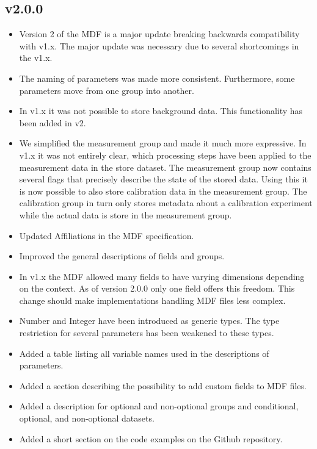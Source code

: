 \documentclass[landscape,a4paper]{article} %
\newcommand{\inlvar}[1]{{\ttfamily#1}}
\begin{document}
\begin{multicols}{2}
\subsection{v2.0.0}

\begin{itemize}
	\item Version 2 of the MDF is a major update breaking backwards compatibility with v1.x. The major update was necessary due to several shortcomings in the v1.x.
	\item The naming of parameters was made more consistent. Furthermore, some parameters move from one group into another.
	\item In v1.x it was not possible to store background data. This functionality has been added in v2.
	\item We simplified the measurement group and made it much more expressive. In v1.x it was not entirely clear, which processing steps have been applied to the measurement data in the store dataset. The \inlvar{measurement} group now contains several flags that precisely describe the state of the stored data. Using this it is now possible to also store calibration data in the \inlvar{measurement} group. The calibration group in turn only stores metadata about a calibration experiment while the actual data is store in the measurement group.
	\item Updated Affiliations in the MDF specification.
	\item Improved the general descriptions of fields and groups.
	\item In v1.x the MDF allowed many fields to have varying dimensions depending on the context. As of version 2.0.0 only one field offers this freedom. This change should make implementations handling MDF files less complex.
	\item \inlvar{Number} and \inlvar{Integer} have been introduced as generic types. The type restriction for several parameters has been weakened to these types.
	\item Added a table listing all variable names used in the descriptions of parameters.
	\item Added a section describing the possibility to add custom fields to MDF files.
	\item Added a description for optional and non-optional groups and conditional, optional, and non-optional datasets.
    \item Added a short section on the code examples on the Github repository.

\end{itemize}
\end{multicols}
\end{document}
